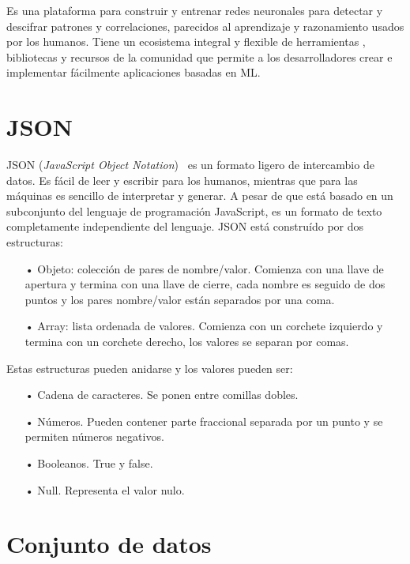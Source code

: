 \documentclass[a4paper, 12pt]{book}
\begin{document}
Es una plataforma para construir y entrenar redes neuronales para detectar y descifrar patrones y correlaciones, parecidos al aprendizaje y razonamiento usados por los humanos. 
Tiene un ecosistema integral y flexible de herramientas , bibliotecas y recursos de la comunidad que permite a los desarrolladores crear e implementar fácilmente aplicaciones basadas en ML.


\section{JSON} 
\label{sec:JSON}

JSON (\emph{JavaScript Object Notation})~\cite{Pagina_de_JSON} es un formato ligero de intercambio de datos. Es fácil de leer y escribir para los humanos, mientras que para las máquinas es sencillo de interpretar y generar. 
A pesar de que está basado en un subconjunto del lenguaje de programación JavaScript, es un formato de texto completamente independiente del lenguaje. JSON está construído por dos estructuras:

\begin{itemize}
	\item[•] Objeto: colección de pares de nombre/valor. Comienza con una llave de apertura y termina con una llave de cierre, cada nombre es seguido de dos puntos y los pares nombre/valor están separados por una coma.
	\item[•] Array: lista ordenada de valores. Comienza con un corchete izquierdo y termina con un corchete derecho, los valores se separan por comas.
\end{itemize}

Estas estructuras pueden anidarse y los valores pueden ser:
	\begin{itemize}
		\item[•] Cadena de caracteres. Se ponen entre comillas dobles.
		\item[•] Números. Pueden contener parte fraccional separada por un punto y se permiten números negativos.
		\item[•] Booleanos. True y false.
		\item[•] Null. Representa el valor nulo.
	\end{itemize}

\section{Conjunto de datos} 
\label{sec:dataset}
\end{document}
